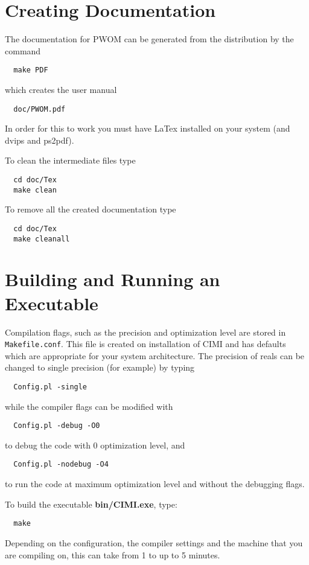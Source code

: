 \section{Creating Documentation}

The documentation for PWOM can be generated from the distribution by
the command
\begin{verbatim}
  make PDF
\end{verbatim}
which creates the user manual
\begin{verbatim}
  doc/PWOM.pdf
\end{verbatim}
In order for this to work you must have
LaTex installed on your system (and dvips and ps2pdf).  

To clean the intermediate files type
\begin{verbatim}
  cd doc/Tex
  make clean
\end{verbatim}
To remove all the created documentation type
\begin{verbatim}
  cd doc/Tex
  make cleanall
\end{verbatim}

\section{Building and Running an Executable}


Compilation flags, such as the precision and optimization 
level are stored in {\tt Makefile.conf}. This file is created on
installation of CIMI and has defaults which are appropriate for
your system architecture.  The precision of reals
can be changed to single precision (for example) by typing
\begin{verbatim}
  Config.pl -single
\end{verbatim}
while the compiler flags can be modified with
\begin{verbatim}
  Config.pl -debug -O0
\end{verbatim}
to debug the code with 0 optimization level, and
\begin{verbatim}
  Config.pl -nodebug -O4
\end{verbatim}
to run the code at maximum optimization level and without the debugging flags.

To build the executable {\bf bin/CIMI.exe}, type:
\begin{verbatim}
  make
\end{verbatim} 
Depending on the configuration, the compiler settings and the machine 
that you are compiling on, this can take from 1 to up to 5 minutes.  


